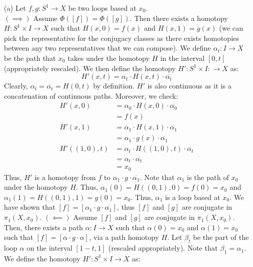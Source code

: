 \documentclass[12pt]{article}
\begin{document}
\begin{solution}
    \bbni
    \begin{itemize}
        \item[(a)] Let $f, g: S^1 \to X$ be two loops based at $x_0$. \\
        $(\implies)$ Assume $\Phi([f]) = \Phi([g])$. Then there exists a homotopy $H: S^1 \times I \to X$ such that $H(x, 0) = f(x)$ and $H(x, 1) = g(x)$ (we can pick the representative for the conjugacy classes as there exists homotopies between any two representatives that we can compose). \bbni
        We define $\alpha_t: I \to X$ be the path that $x_0$ takes under the homotopy $H$ in the interval $[0, t]$ (appropriately rescaled). We then define the homotopy $H': S^1  \times I: \to X$ as: 
        \[ H'(x, t) = \alpha_t \cdot H(x, t) \cdot \overline{\alpha_t} \]
        Clearly, $\alpha_t = \overline{\alpha_t}= H(0, t)$ by definition. $H'$ is also continuous as it is a concatenation of continuous paths. Moreover, we check:
            \begin{align*}
                H'(x, 0) &= \alpha_0 \cdot H(x, 0) \cdot \overline{\alpha_0} \\
                &= f(x) \\
                H'(x, 1) &= \alpha_1 \cdot H(x, 1) \cdot \overline{\alpha_1} \\
                &= \alpha_1 \cdot g(x) \cdot \overline{\alpha_1} \\
                H'((1,0), t) &= \alpha_t \cdot H((1,0), t) \cdot \overline{\alpha_t} \\
                &= \alpha_t \cdot \overline{\alpha_t} \\
                &= x_0 
            \end{align*}
        Thus, $H'$ is a homotopy from $f$ to $\alpha_1 \cdot g \cdot \overline{\alpha_1}$. Note that $\alpha_1$ is the path of $x_0$ under the homotopy $H$. Thus, $\alpha_1(0) = H((0, 1), 0) = f(0) = x_0$ and $\alpha_1(1) = H((0, 1), 1) = g(0) = x_0$. Thus, $\alpha_1$ is a loop based at $x_0$. We have shown that $[f] = [\alpha_1 \cdot g \cdot \overline{\alpha_1}]$, thus $[f]$ and $[g]$ are conjugate in $\pi_1(X, x_0)$. \bbni  
        $(\impliedby)$ Assume $[f]$ and $[g]$ are conjugate in $\pi_1(X, x_0)$. Then, there exists a path $\alpha: I \to X$ such that $\alpha(0) = x_0$ and $\alpha(1) = x_0$ such that $[f] = [\overline{\alpha} \cdot g \cdot \alpha]$, via a path homotopy $H$. Let $\beta_t$ be the part of the loop $\alpha$ on the interval $[1-t, 1]$ (rescaled appropriately). Note that $\beta_1 = \alpha_1$. We define the homotopy $H': S^1 \times I \to X$ as: 

\end{itemize}
\end{solution}
\end{document}
